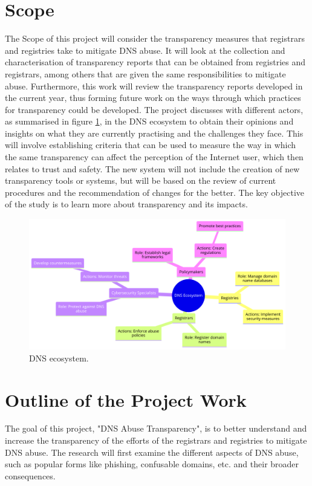 \section{Scope}	
The Scope of this project will consider the transparency measures that registrars and registries take to mitigate DNS abuse. It will look at the collection and characterisation of transparency reports that can be obtained from registries and registrars, among others that are given the same responsibilities to mitigate abuse. Furthermore, this work will review the transparency reports developed in the current year, thus forming future work on the ways through which practices for transparency could be developed. The project discusses with different actors, as summarised in figure \ref{fig:dnsintrointro}, in the DNS ecosystem to obtain their opinions and insights on what they are currently practising and the challenges they face. This will involve establishing criteria that can be used to measure the way in which the same transparency can affect the perception of the Internet user, which then relates to trust and safety. The new system will not include the creation of new transparency tools or systems, but will be based on the review of current procedures and the recommendation of changes for the better. The key objective of the study is to learn more about transparency and its impacts.  

\begin{figure}[H]
    \centering
    \includegraphics[width=0.7\linewidth]{introduction/diagram (8).png}
    \caption{ DNS ecosystem.}
    \label{fig:dnsintrointro}
\end{figure}

\section{ Outline of the Project Work} 

The goal of this project, "DNS Abuse Transparency", is to better understand and increase the transparency of the efforts of the registrars and registries to mitigate DNS abuse. The research will first examine the different aspects of DNS abuse, such as popular forms like phishing, confusable domains, etc. and their broader consequences. 

